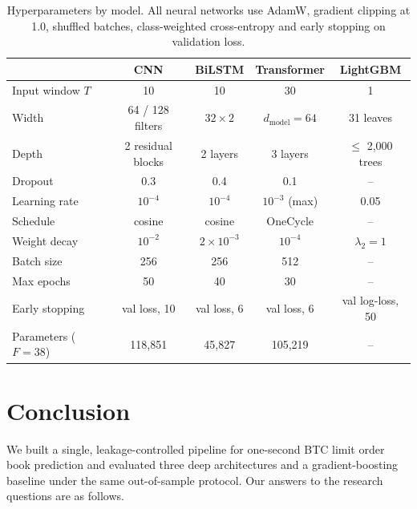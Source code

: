 \begin{table}[htbp]
\centering
\caption{Hyperparameters by model. All neural networks use AdamW, gradient clipping at
1.0, shuffled batches, class-weighted cross-entropy and early stopping on validation
loss.}
\label{tab:hparams}
\begin{tabular}{lcccc}
\toprule
 & CNN & BiLSTM & Transformer & LightGBM \\
\midrule
Input window $T$ & 10 & 10 & 30 & 1 \\
Width            & 64 / 128 filters & $32\times2$ & $d_{\text{model}}=64$ & 31 leaves \\
Depth            & 2 residual blocks & 2 layers & 3 layers & $\le$ 2,000 trees \\
Dropout          & 0.3 & 0.4 & 0.1 & -- \\
Learning rate    & $10^{-4}$ & $10^{-4}$ & $10^{-3}$ (max) & 0.05 \\
Schedule         & cosine & cosine & OneCycle & -- \\
Weight decay     & $10^{-2}$ & $2\times10^{-3}$ & $10^{-4}$ & $\lambda_2 = 1$ \\
Batch size       & 256 & 256 & 512 & -- \\
Max epochs       & 50 & 40 & 30 & -- \\
Early stopping   & val loss, 10 & val loss, 6 & val loss, 6 & val log-loss, 50 \\
Parameters ($F=38$) & 118,851 & 45,827 & 105,219 & -- \\
\bottomrule
\end{tabular}
\end{table}


\section{Conclusion}
\label{sec:conclusion}
We built a single, leakage-controlled pipeline for one-second BTC limit order book
prediction and evaluated three deep architectures and a gradient-boosting baseline under
the same out-of-sample protocol. Our answers to the research questions are as follows.

